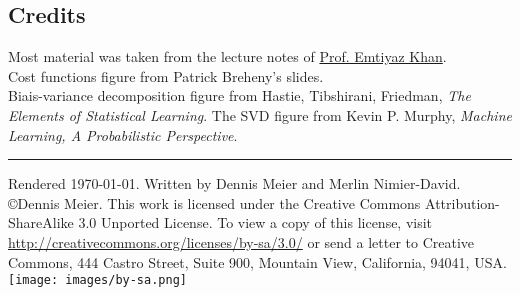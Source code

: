 \documentclass[10pt,a4paper,landscape]{article}
\begin{document}
\begin{multicols*}{4}


\section{Credits}
Most material was taken from the lecture notes of \href{http://people.epfl.ch/228491}{Prof. Emtiyaz Khan}.\\
Cost functions figure from Patrick Breheny's slides.\\
Biais-variance decomposition figure from Hastie, Tibshirani, Friedman, \textit{The Elements of Statistical Learning}.
The SVD figure from Kevin P. Murphy, \textit{Machine Learning, A Probabilistic Perspective}.

\hrule
\tiny
Rendered \today. Written by Dennis Meier and Merlin Nimier-David.
\copyright Dennis Meier. This work is licensed under the Creative Commons Attribution-ShareAlike 3.0 Unported License.
To view a copy of this license, visit \href{http://creativecommons.org/licenses/by-sa/3.0/}{http://creativecommons.org/licenses/by-sa/3.0/} or
send a letter to Creative Commons, 444 Castro Street, Suite 900, Mountain View, California, 94041, USA.
\texttt{[image: images/by-sa.png]}

\end{multicols*}
\end{document}

